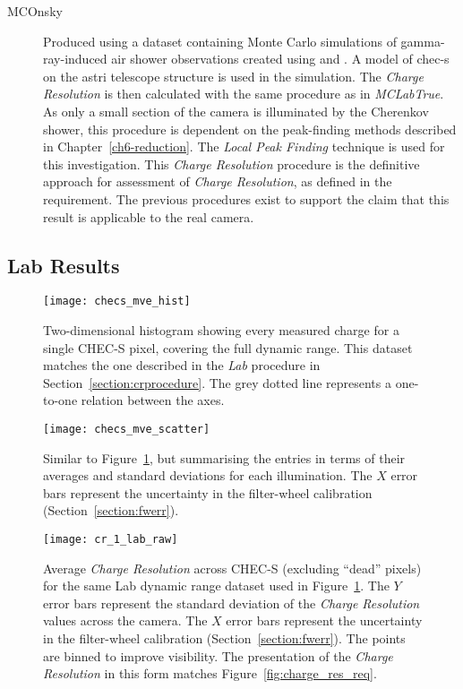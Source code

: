 \begin{description}
\item [MCOnsky] Produced using a dataset containing Monte Carlo simulations of gamma-ray-induced air shower observations created using  and . A model of \gls{chec-s} on the \gls{astri} telescope structure is used in the simulation. The \textit{Charge Resolution} is then calculated with the same procedure as in \textit{MCLabTrue}. As only a small section of the camera is illuminated by the Cherenkov shower, this procedure is dependent on the peak-finding methods described in Chapter~\ref{ch6-reduction}. The \textit{Local Peak Finding} technique is used for this investigation. This \textit{Charge Resolution} procedure is the definitive approach for assessment of \textit{Charge Resolution}, as defined in the requirement. The previous procedures exist to support the claim that this result is applicable to the real camera.
\end{description}

\subsection{Lab Results}

\begin{figure}
	\centering
    \texttt{[image: checs\_mve\_hist]} 
	\caption[CHEC-S measured charge versus average expected charge.]{Two-dimensional histogram showing every measured charge for a single CHEC-S pixel, covering the full dynamic range. This dataset matches the one described in the \textit{Lab} procedure in Section~\ref{section:crprocedure}. The grey dotted line represents a one-to-one relation between the axes.}
	\label{fig:checs_mve_hist}
\end{figure}

\begin{figure}
	\centering
    \texttt{[image: checs\_mve\_scatter]} 
	\caption[CHEC-S average measured charge versus average expected charge.]{Similar to Figure~\ref{fig:checs_mve_hist}, but summarising the entries in terms of their averages and standard deviations for each illumination. The $X$ error bars represent the uncertainty in the filter-wheel calibration (Section~\ref{section:fwerr}).}
	\label{fig:checs_mve_scatter}
\end{figure}

\begin{figure}
	\centering
    \texttt{[image: cr\_1\_lab\_raw]} 
	\caption[\textit{Charge Resolution} of the Lab dataset in default units.]{Average \textit{Charge Resolution} across CHEC-S (excluding ``dead'' pixels) for the same Lab dynamic range dataset used in Figure~\ref{fig:checs_mve_hist}. The $Y$ error bars represent the standard deviation of the \textit{Charge Resolution} values across the camera. The $X$ error bars represent the uncertainty in the filter-wheel calibration (Section~\ref{section:fwerr}). The points are binned to improve visibility. The presentation of the \textit{Charge Resolution} in this form matches Figure~\ref{fig:charge_res_req}.}
	\label{fig:cr_1_lab_raw}
\end{figure}

